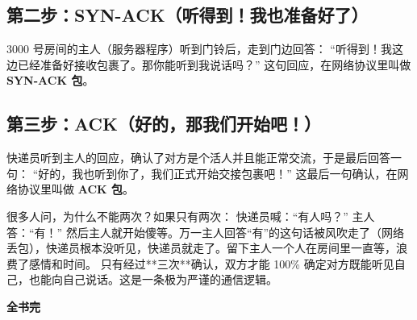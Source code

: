 \documentclass[12pt,a4paper]{ctexart}
\begin{document}
\subsection{第二步：SYN-ACK（听得到！我也准备好了）}
3000 号房间的主人（服务器程序）听到门铃后，走到门边回答：
“听得到！我这边已经准备好接收包裹了。那你能听到我说话吗？”
这句回应，在网络协议里叫做 \textbf{SYN-ACK 包}。

\subsection{第三步：ACK（好的，那我们开始吧！）}
快递员听到主人的回应，确认了对方是个活人并且能正常交流，于是最后回答一句：
“好的，我也听到你了，我们正式开始交接包裹吧！”
这最后一句确认，在网络协议里叫做 \textbf{ACK 包}。

\begin{tcolorbox}[colback=green!5,colframe=green!75!black,title=为什么非要三次？,fonttitle=\bfseries,boxrule=0.5pt,arc=3mm]
很多人问，为什么不能两次？如果只有两次：
快递员喊：“有人吗？”
主人答：“有！”
然后主人就开始傻等。万一主人回答“有”的这句话被风吹走了（网络丢包），快递员根本没听见，快递员就走了。留下主人一个人在房间里一直等，浪费了感情和时间。
只有经过**三次**确认，双方才能 100\% 确定对方既能听见自己，也能向自己说话。这是一条极为严谨的通信逻辑。
\end{tcolorbox}

\vspace{2cm}
\begin{center}
\textbf{\huge 全书完}
\end{center}
\end{document}
